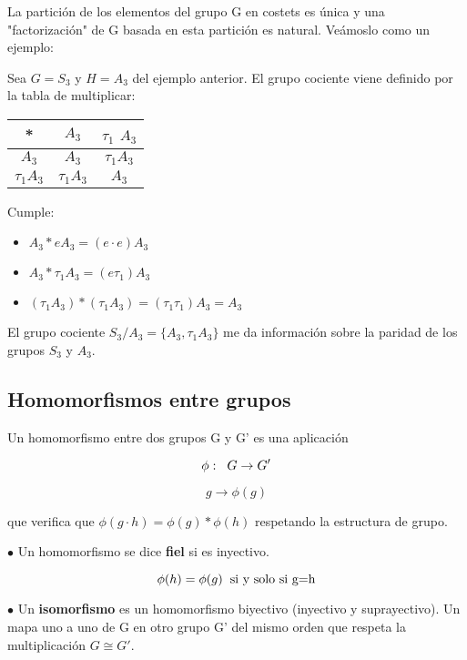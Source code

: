 \documentclass{article}
\begin{document}
 La partición de los elementos del grupo G en costets es única y una "factorización" de G basada en esta partición es natural. Veámoslo como un ejemplo:

 \smallskip
 Sea $G=S_3$ y $H=A_3$ del ejemplo anterior. El grupo cociente viene definido por la tabla de multiplicar:
 \begin{center}
\begin{tabular}[b]{ c | c c}
 * & $A_3$ & $\tau _1$ $A_3$\\
 \hline
 $A_3$ & $A_3$ & $\tau _1 A_3$ \\

 $\tau _1 A_3$ & $\tau _1 A_3$ & $A_3$
 \end{tabular}

 \end{center}


 Cumple:

\begin{itemize}
    \item $A_3*eA_3=(e\cdot e)A_3$
    \item $A_3*\tau _1A_3=(e\tau _1)A_3$

 \item $(\tau _1A_3)*(\tau _1 A_3)=(\tau _1 \tau _1)A_3=A_3$

\end{itemize}

 \smallskip
 El grupo cociente $S_3/A_3= \lbrace A_3, \tau _1 A_3\rbrace $ me da información sobre la paridad de los grupos $S_3$ y $A_3$.

 \subsection{Homomorfismos entre grupos}
 Un homomorfismo entre dos grupos G y G' es una aplicación

 $$\phi : \hspace{0.2cm} G \rightarrow G'$$

 $$g\rightarrow \phi(g)$$

 que verifica que $\phi (g\cdot h)=\phi (g)*\phi (h)$ respetando la estructura de grupo.

 \smallskip
$\bullet$ Un homomorfismo se dice \textbf{fiel} si es inyectivo.

 $$\phi (h)=\phi (g) \hspace{0.2cm} \text{si y solo si g=h}$$

 \smallskip
$\bullet$ Un \textbf{isomorfismo} es un homomorfismo biyectivo (inyectivo y suprayectivo). Un mapa uno a uno de G en otro grupo G' del mismo orden que respeta la multiplicación $G\cong G'$.
\end{document}
